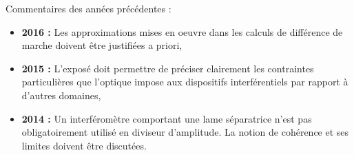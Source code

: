 \begin{reportBlock}{Commentaires des années précédentes :}
    \begin{itemize}
        \item \textbf{2016 :} Les approximations mises en oeuvre dans les calculs de différence de marche doivent être justifiées a priori,
        \item \textbf{2015 :} L’exposé doit permettre de préciser clairement les contraintes particulières que l’optique impose aux dispositifs interférentiels par rapport à d’autres domaines,
        \item \textbf{2014 :} Un interféromètre comportant une lame séparatrice n’est pas obligatoirement utilisé en diviseur d’amplitude. La notion de cohérence et ses limites doivent être discutées.
    \end{itemize}
\end{reportBlock}
